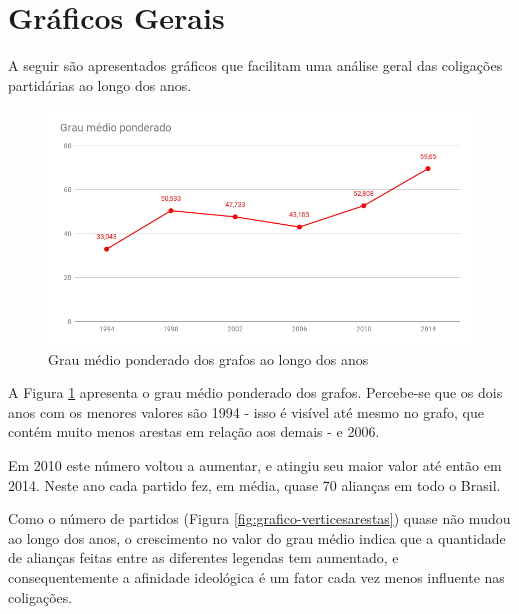 \section{Gráficos Gerais}
\label{resultados__graficos-gerais}

A seguir são apresentados gráficos que facilitam uma análise geral das coligações partidárias ao longo dos anos. 

\begin{figure}[H]
\includegraphics[width=1\textwidth]{4-resultados/graficos/graumedioponderado.png}
\centering
\caption{
    Grau médio ponderado dos grafos ao longo dos anos
}
\label{fig:grafico-graumedioponderado}
\end{figure}

A Figura \ref{fig:grafico-graumedioponderado} apresenta o grau médio ponderado dos grafos. Percebe-se que os dois anos com os menores valores são 1994 - isso é visível até mesmo no grafo, que contém muito menos arestas em relação aos demais -  e 2006.

Em 2010 este número voltou a aumentar, e atingiu seu maior valor até então em 2014. Neste ano cada partido fez, em média, quase 70 alianças em todo o Brasil. 

Como o número de partidos (Figura \ref{fig:grafico-verticesarestas}) quase não mudou ao longo dos anos, o crescimento no valor do grau médio indica que a quantidade de alianças feitas entre as diferentes legendas tem aumentado, e consequentemente a afinidade ideológica é um fator cada vez menos influente nas coligações.

